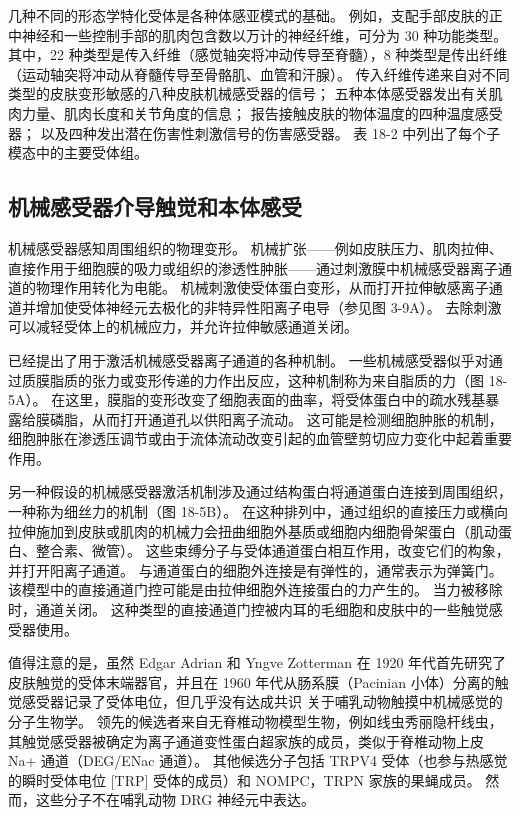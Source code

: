 几种不同的形态学特化受体是各种体感亚模式的基础。 例如，支配手部皮肤的正中神经和一些控制手部的肌肉包含数以万计的神经纤维，可分为 30 种功能类型。 其中，22 种类型是传入纤维（感觉轴突将冲动传导至脊髓），8 种类型是传出纤维（运动轴突将冲动从脊髓传导至骨骼肌、血管和汗腺）。 传入纤维传递来自对不同类型的皮肤变形敏感的八种皮肤机械感受器的信号； 五种本体感受器发出有关肌肉力量、肌肉长度和关节角度的信息； 报告接触皮肤的物体温度的四种温度感受器； 以及四种发出潜在伤害性刺激信号的伤害感受器。 表 18-2 中列出了每个子模态中的主要受体组。

\subsection{机械感受器介导触觉和本体感受}
机械感受器感知周围组织的物理变形。 机械扩张——例如皮肤压力、肌肉拉伸、直接作用于细胞膜的吸力或组织的渗透性肿胀——通过刺激膜中机械感受器离子通道的物理作用转化为电能。 机械刺激使受体蛋白变形，从而打开拉伸敏感离子通道并增加使受体神经元去极化的非特异性阳离子电导（参见图 3-9A）。 去除刺激可以减轻受体上的机械应力，并允许拉伸敏感通道关闭。

已经提出了用于激活机械感受器离子通道的各种机制。 一些机械感受器似乎对通过质膜脂质的张力或变形传递的力作出反应，这种机制称为来自脂质的力（图 18-5A）。 在这里，膜脂的变形改变了细胞表面的曲率，将受体蛋白中的疏水残基暴露给膜磷脂，从而打开通道孔以供阳离子流动。 这可能是检测细胞肿胀的机制，细胞肿胀在渗透压调节或由于流体流动改变引起的血管壁剪切应力变化中起着重要作用。

另一种假设的机械感受器激活机制涉及通过结构蛋白将通道蛋白连接到周围组织，一种称为细丝力的机制（图 18-5B）。 在这种排列中，通过组织的直接压力或横向拉伸施加到皮肤或肌肉的机械力会扭曲细胞外基质或细胞内细胞骨架蛋白（肌动蛋白、整合素、微管）。 这些束缚分子与受体通道蛋白相互作用，改变它们的构象，并打开阳离子通道。 与通道蛋白的细胞外连接是有弹性的，通常表示为弹簧门。 该模型中的直接通道门控可能是由拉伸细胞外连接蛋白的力产生的。 当力被移除时，通道关闭。 这种类型的直接通道门控被内耳的毛细胞和皮肤中的一些触觉感受器使用。

值得注意的是，虽然 Edgar Adrian 和 Yngve Zotterman 在 1920 年代首先研究了皮肤触觉的受体末端器官，并且在 1960 年代从肠系膜（Pacinian 小体）分离的触觉感受器记录了受体电位，但几乎没有达成共识 关于哺乳动物触摸中机械感觉的分子生物学。 领先的候选者来自无脊椎动物模型生物，例如线虫秀丽隐杆线虫，其触觉感受器被确定为离子通道变性蛋白超家族的成员，类似于脊椎动物上皮 Na+ 通道（DEG/ENac 通道）。 其他候选分子包括 TRPV4 受体（也参与热感觉的瞬时受体电位 [TRP] 受体的成员）和 NOMPC，TRPN 家族的果蝇成员。 然而，这些分子不在哺乳动物 DRG 神经元中表达。

